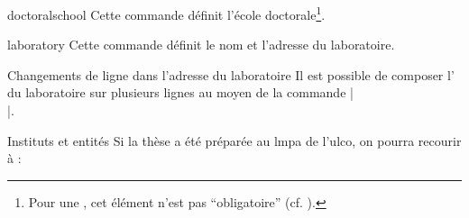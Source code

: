 %
\begin{docCommand}[doc description=\mandatory]{doctoralschool}{}
  Cette commande définit l'école doctorale\footnote{Pour une ,
    cet élément n'est pas \enquote{obligatoire} (cf. ).}.
\end{docCommand}
%
\begin{docCommand}[doc description=\mandatory]{laboratory}{}
  Cette commande définit le nom et l'adresse du laboratoire.
\end{docCommand}
%
\begin{dbremark}{Changements de ligne dans l'adresse du laboratoire}{}
  Il est possible de composer l' du laboratoire sur plusieurs
  lignes au moyen de la commande |\\|.
\end{dbremark}
%
\begin{dbexample}{Instituts et entités}{}
  Si la thèse a été préparée au \gls{lmpa} de l'\gls{ulco}, on
  pourra recourir à :
  \NoAutoSpacing%
\begin{preamblecode}[listing options={deletekeywords={[5]institute,doctoralschool}}]
\end{preamblecode}
\end{dbexample}
%
